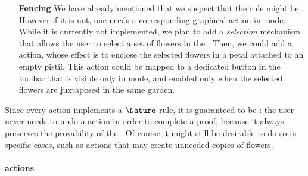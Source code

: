 \begin{scope}
\begin{itemize}
  \item[\textbf{Fencing}] We have already mentioned that we suspect that the
   rule might be . However if it is not, one needs a
  corresponding graphical action in \Proof mode. While it is currently not
  implemented, we plan to add a \emph{selection} mechanism that allows the user
  to select a set of flowers in the . Then, we could add a 
  action, whose effect is to enclose the selected flowers in a petal attached to
  an empty pistil. This action could be mapped to a dedicated button in the
  toolbar that is visible only in \Proof mode, and enabled only when the
  selected flowers are juxtaposed in the same garden.
\end{itemize}

Since every \Proof action implements a $\Nature$-rule, it is guaranteed to be
\emph{}: the user never needs to undo a \Proof action in order to
complete a proof, because it always preserves the provability of the . Of
course it might still be desirable to do so in specific cases, such as
 actions that may create unneeded copies of flowers.

\paragraph{\Edit actions}


\end{scope}
